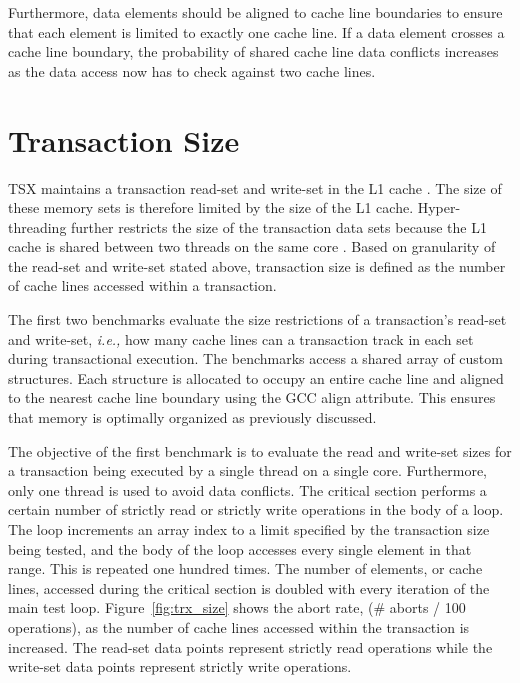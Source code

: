 \documentclass[11pt]{book}
\begin{document}
Furthermore, data elements should be aligned to cache line boundaries to ensure that each
element is limited to exactly one cache line.  If a data element crosses a cache line
boundary, the probability of shared cache line data conflicts increases as the data access
now has to check against two cache lines.

\section{Transaction Size}

TSX maintains a transaction read-set and write-set in the L1 cache
\cite{intel_opt_man}.  The size of these memory sets is therefore limited by the
size of the L1 cache.  Hyper-threading further restricts the size of the
transaction data sets because the L1 cache is shared between two threads on the
same core \cite{intel_opt_man}.  Based on granularity of the read-set and
write-set stated above, transaction size is defined as the number of cache lines
accessed within a transaction.

The first two benchmarks evaluate the size restrictions of a transaction's
read-set and write-set, \emph{i.e.,} how many cache lines can a transaction
track in each set during transactional execution.  The benchmarks access a
shared array of custom structures.  Each structure is allocated to occupy an
entire cache line and aligned to the nearest cache line boundary using the GCC
align attribute.  This ensures that memory is optimally organized as previously
discussed.  

The objective of the first benchmark is to evaluate the read and write-set sizes
for a transaction being executed by a single thread on a single core.
Furthermore, only one thread is used to avoid data conflicts.  The critical
section performs a certain number of strictly read or strictly write operations
in the body of a loop.  The loop increments an array index to a limit specified
by the transaction size being tested, and the body of the loop accesses every
single element in that range.  This is repeated one hundred times.  The number
of elements, or cache lines, accessed during the critical section is doubled
with every iteration of the main test loop.  Figure~\ref{fig:trx_size} shows the
abort rate, (\# aborts / 100 operations), as the number of cache lines accessed
within the transaction is increased.  The read-set data points represent
strictly read operations while the write-set data points represent strictly
write operations.
\end{document}
